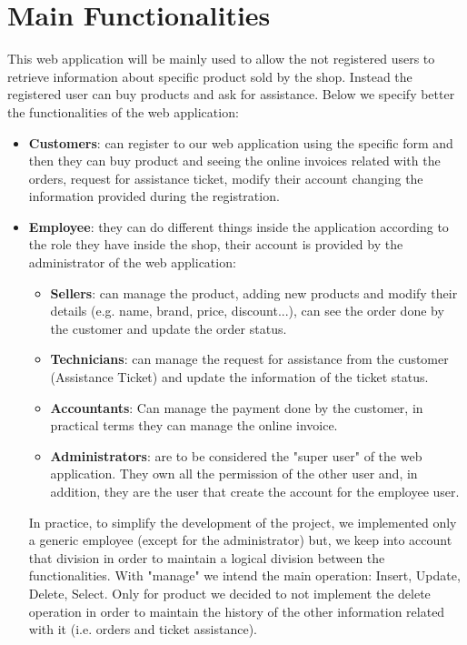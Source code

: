 \section{Main Functionalities}

This web application will be mainly used to allow the not registered users to retrieve information about specific product sold by the shop. Instead the registered user can buy products and ask for assistance. Below we specify better the functionalities of the web application:
\begin{itemize}
    \item \textbf{Customers}: can register to our web application using the specific form and then they can buy product and seeing the online invoices related with the orders, request for assistance ticket, modify their account changing the information provided during the registration.
    \item \textbf{Employee}: they can do different things inside the application according to the role they have inside the shop, their account is provided by the administrator of the web application:
    \begin{itemize}
        \item \textbf{Sellers}: can manage the product, adding new products and modify their details (e.g. name, brand, price, discount...), can see the order done by the customer and update the order status.
        \item \textbf{Technicians}: can manage the request for assistance from the customer (Assistance Ticket) and update the information of the ticket status.
        \item \textbf{Accountants}: Can manage the payment done by the customer, in practical terms they can manage the online invoice.
        \item \textbf{Administrators}: are to be considered the "super user" of the web application. They own all the permission of the other user and, in addition, they are the user that create the account for the employee user.
    \end{itemize}
    In practice, to simplify the development of the project, we implemented only a generic employee (except for the administrator) but, we keep into account that division in order to maintain a logical division between the functionalities.
    With "manage" we intend the main operation: Insert, Update, Delete, Select. Only for product we decided to not implement the delete operation in order to maintain the history of the other information related with it (i.e. orders and ticket assistance).
\end{itemize}